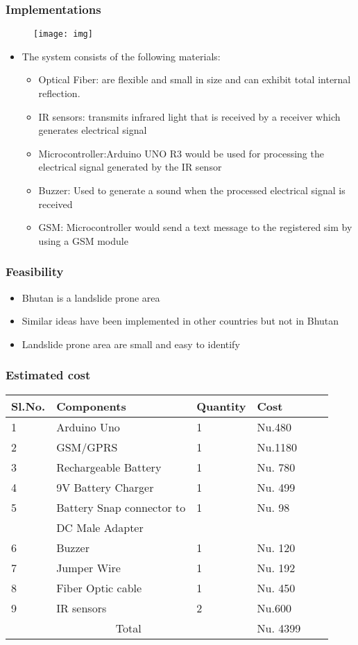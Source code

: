 \documentclass{beamer}
\begin{document}
\begin{frame}
	\frametitle{Implementations}
	\begin{figure}
		\texttt{[image: img]}
	\end{figure}
\end{frame}
\begin{frame}
	\begin{itemize}
		\item <1->The system consists of the following materials:
		\begin{itemize}
			\item Optical Fiber: are flexible and small in size and can exhibit total internal reflection.
			\item IR sensors: transmits infrared light that is received by a receiver which generates electrical signal
			\item Microcontroller:Arduino UNO R3 would be used for processing the electrical signal generated by the IR sensor
			\item Buzzer: Used to generate a sound when the processed electrical signal is received
			\item GSM: Microcontroller would send a text message to the registered sim by using a GSM module
		\end{itemize}
	\end{itemize}
\end{frame}
\begin{frame}
	\frametitle{Feasibility}
	\begin{itemize}
		\item Bhutan is a landslide prone area
		\item Similar ideas have been implemented in other countries but not in Bhutan
		\item Landslide prone area are small and easy to identify 
	\end{itemize}
\end{frame}
\begin{frame}
	\frametitle{Estimated cost}
	\begin{tabular}{|l|l|l|l|l|l|}\hline
		Sl.No. & Components & Quantity & Cost \\\hline
		1 & Arduino Uno & 1 & Nu.480 \\
		2 & GSM/GPRS & 1 & Nu.1180\\
		3 & Rechargeable Battery & 1 & Nu. 780 \\
		4 & 9V Battery Charger & 1 & Nu. 499 \\
		5 & Battery Snap connector to &1 & Nu. 98 \\
		  & DC Male Adapter &     &     \\
		6 & Buzzer & 1 & Nu. 120    \\
		7 & Jumper Wire & 1 & Nu. 192 \\
		8 & Fiber Optic cable & 1 & Nu. 450 \\
		9 & IR sensors & 2 & Nu.600 \\ \hline
		\multicolumn{3}{|c|}{Total} & Nu. 4399\\
		  \hline
	\end{tabular}
\end{frame}
\end{document}
